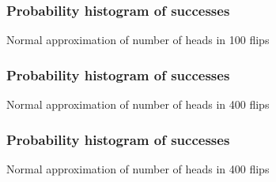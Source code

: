 \documentclass[handout]{beamer}
\begin{document}
   \begin{frame}
   \frametitle{Probability histogram of successes}
   \begin{center}
   \end{center}
   Normal approximation of number of heads in 100 flips
   \end{frame}



   \begin{frame}
   \frametitle{Probability histogram of successes}
   \begin{center}
   \end{center}
   Normal approximation of number of heads in 400 flips
   \end{frame}



   \begin{frame}
   \frametitle{Probability histogram of successes}
   \begin{center}
   \end{center}
   Normal approximation of number of heads in 400 flips
   \end{frame}
\end{document}
